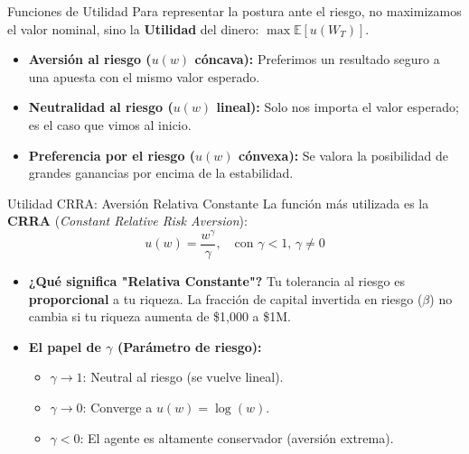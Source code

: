 \documentclass[xcolor=dvipsnames]{beamer}
\begin{document}
\begin{frame}{Funciones de Utilidad}
Para representar la postura ante el riesgo, no maximizamos el valor nominal, sino la \textbf{Utilidad} del dinero: $\max \mathbb{E}[u(W_T)]$.

\begin{itemize}
    \item<2-> \textbf{Aversi\'on al riesgo ($u(w)$ c\'oncava):} Preferimos un resultado seguro a una apuesta con el mismo valor esperado.
    \item<3-> \textbf{Neutralidad al riesgo ($u(w)$ lineal):} Solo nos importa el valor esperado; es el caso que vimos al inicio.
    \item<4-> \textbf{Preferencia por el riesgo ($u(w)$ c\'onvexa):} Se valora la posibilidad de grandes ganancias por encima de la estabilidad.
\end{itemize}



\end{frame}

\begin{frame}{Utilidad CRRA: Aversi\'on Relativa Constante}
La funci\'on m\'as utilizada es la \textbf{CRRA} (\textit{Constant Relative Risk Aversion}):
\[ u(w) = \frac{w^\gamma}{\gamma}, \quad \text{con } \gamma < 1, \, \gamma \neq 0 \]

\begin{itemize}
    \item \textbf{¿Qu\'e significa "Relativa Constante"?} 
    Tu tolerancia al riesgo es \textbf{proporcional} a tu riqueza. La fracci\'on de capital invertida en riesgo ($\beta$) no cambia si tu riqueza aumenta de \$1,000 a \$1M.
    
    \item<2-> \textbf{El papel de $\gamma$ (Par\'ametro de riesgo):}
    \begin{itemize}
        \item $\gamma \to 1$: Neutral al riesgo (se vuelve lineal).
        \item $\gamma \to 0$: Converge a \textbf{$u(w) = \log(w)$}.
        \item $\gamma < 0$: El agente es altamente conservador (aversi\'on extrema).
    \end{itemize}
\end{itemize}
\end{frame}
\end{document}
